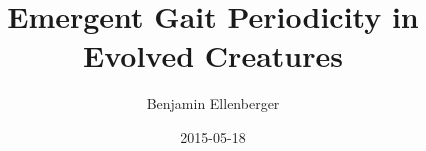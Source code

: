 \documentclass{beamer}
\author{Benjamin Ellenberger}
\title{Emergent Gait Periodicity in Evolved Creatures}
\date{2015-05-18}
\begin{document}
\titleframe























\end{document}
